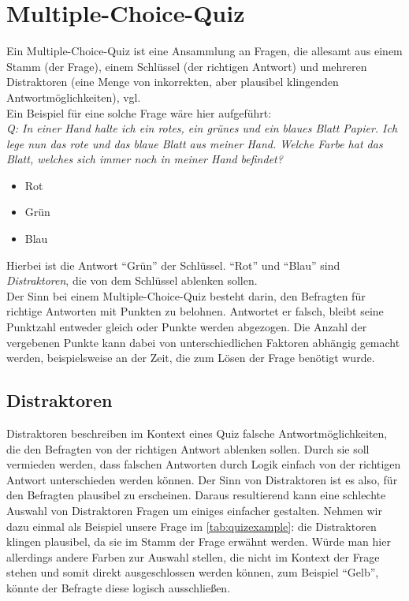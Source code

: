 \documentclass[headsepline,titlepage,ngerman,twoside,12pt]{report}
\newcommand\todo[1]{}%
\begin{document}
\section{Multiple-Choice-Quiz}
\label{sec:quiz}
Ein Multiple-Choice-Quiz ist eine Ansammlung an Fragen, die allesamt aus einem Stamm (der Frage), einem Schlüssel (der richtigen Antwort) und mehreren Distraktoren (eine Menge von inkorrekten, aber plausibel klingenden Antwortmöglichkeiten), vgl. \todo{Quelle mit citet zitieren}
\\Ein Beispiel für eine solche Frage wäre hier aufgeführt:
\\\textit{Q: In einer Hand halte ich ein rotes, ein grünes und ein blaues Blatt Papier. Ich lege nun das rote und das blaue Blatt aus meiner Hand. Welche Farbe hat das Blatt, welches sich immer noch in meiner Hand befindet?}
\label{tab:quizexample}
\begin{itemize}
  \item Rot
  \item Grün
  \item Blau
\end{itemize}
Hierbei ist die Antwort \enquote{Grün} der Schlüssel. \enquote{Rot} und \enquote{Blau} sind \textit{Distraktoren}, die von dem Schlüssel ablenken sollen.
\\Der Sinn bei einem Multiple-Choice-Quiz besteht darin, den Befragten für richtige Antworten mit Punkten zu belohnen. Antwortet er falsch, bleibt seine Punktzahl entweder gleich oder Punkte werden abgezogen. Die Anzahl der vergebenen Punkte kann dabei von unterschiedlichen Faktoren abhängig gemacht werden, beispielsweise an der Zeit, die zum Lösen der Frage benötigt wurde.
\subsection{Distraktoren}
\label{sub:distraktoren}
Distraktoren beschreiben im Kontext eines Quiz falsche Antwortmöglichkeiten, die den Befragten von der richtigen Antwort ablenken sollen.
Durch sie soll vermieden werden, dass falschen Antworten durch Logik einfach von der richtigen Antwort unterschieden werden können. Der Sinn von Distraktoren ist es also, für den Befragten plausibel zu erscheinen.
Daraus resultierend kann eine schlechte Auswahl von Distraktoren Fragen um einiges einfacher gestalten. Nehmen wir dazu einmal als Beispiel unsere Frage im \cref{tab:quizexample}:
die Distraktoren klingen plausibel, da sie im Stamm der Frage erwähnt werden. Würde man hier allerdings andere Farben zur Auswahl stellen, die nicht im Kontext der Frage stehen und somit direkt ausgeschlossen werden können, zum Beispiel \enquote{Gelb}, könnte der Befragte diese logisch ausschließen. 
\end{document}
